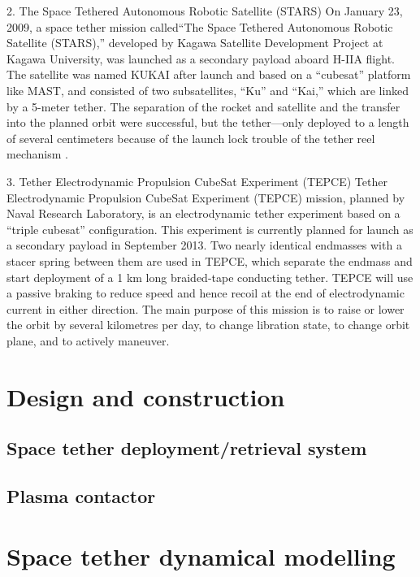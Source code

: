 2.	The Space Tethered Autonomous Robotic Satellite (STARS)
On January 23, 2009, a space tether mission called“The Space Tethered Autonomous Robotic Satellite (STARS),” developed by Kagawa Satellite Development Project at Kagawa University, was launched as a secondary payload aboard H-IIA flight. The satellite was named KUKAI after launch and based on a “cubesat” platform like MAST, and consisted of two subsatellites, “Ku” and “Kai,” which are linked by a 5-meter tether. The separation of the rocket and satellite and the transfer into the planned orbit were successful, but the tether—only deployed to a length of several centimeters because of the launch lock trouble of the tether reel mechanism .

3.	Tether Electrodynamic Propulsion CubeSat Experiment (TEPCE)
Tether Electrodynamic Propulsion CubeSat Experiment (TEPCE) mission, planned by Naval Research Laboratory, is an electrodynamic tether experiment based on a “triple cubesat” configuration. This experiment is currently planned for launch as a secondary payload in September 2013. Two nearly identical endmasses with a stacer spring between them are used in TEPCE, which separate the endmass and start deployment of a 1 km long braided-tape conducting tether. TEPCE will use a passive braking to reduce speed and hence recoil at the end of electrodynamic current in either direction.
The main purpose of this mission is to raise or lower the orbit by several kilometres per day, to change libration state, to change orbit plane, and to actively maneuver.


\section{Design and construction}

\subsection{Space tether deployment/retrieval system}

\subsection{Plasma contactor}

\section{Space tether dynamical modelling}



\newpage
